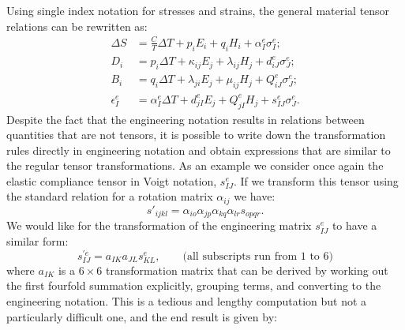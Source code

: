 Using single index notation for stresses and strains, the general material tensor relations can be rewritten as:
\begin{subequations}\begin{align}
	\Delta S &= \frac{C}{T}\Delta T +p_iE_i + q_iH_i + \alpha^e_{I}\sigma^e_{I};\\
	D_i &= p_i\Delta T + \kappa_{ij}E_j + \lambda_{ij} H_j + d^e_{iJ}\sigma^e_{J};\\
	B_i &= q_i\Delta T + \lambda_{ji}E_j + \mu_{ij} H_j + Q^e_{iJ}\sigma^e_{J};\\
	\epsilon^e_{I} &= \alpha^e_{I}\Delta T +d^e_{jI}E_j + Q^e_{jI} H_j + s^e_{IJ}\sigma^e_{J}.
\end{align}\end{subequations}
Despite the fact that the engineering notation results in relations between quantities that are not tensors, it is possible to write down the transformation rules directly in engineering notation and obtain expressions that are similar to the regular tensor transformations. As an example we consider once again the elastic compliance tensor in Voigt notation, $s^e_{IJ}$.  If we transform this tensor using the standard relation for a rotation matrix $\alpha_{ij}$ we have:
\[
	s'_{ijkl} = \alpha_{io}\alpha_{jp}\alpha_{kq}\alpha_{lr} s_{opqr}.
\]
We would like for the transformation of the engineering matrix $s^e_{IJ}$ to have a similar form:
\[
	s^{\prime e}_{IJ} = a_{IK}a_{JL} s^e_{KL},\qquad\text{(all subscripts run from $1$ to $6$)}
\]
where $a_{IK}$ is a $6\times 6$ transformation matrix that can be derived by working out the first fourfold summation explicitly, grouping terms, and converting to the engineering notation.  This is a tedious and lengthy computation but not a particularly difficult one, and the end result is given by:
